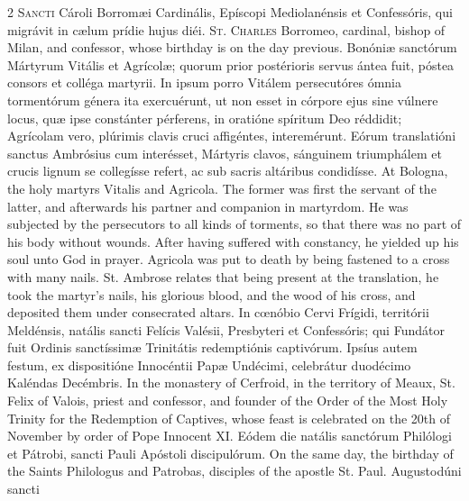 \begin{paracol}{2}
	\lettrine[lines=2]{S}{ancti} Cároli Borromæi Cardinális, Epíscopi
	Mediolanénsis et Confessóris, qui migrávit in cælum prídie hujus diéi.
\switchcolumn
{}
	\lettrine[lines=2]{S}{t. Charles} Borromeo, cardinal, bishop of Milan, and
	confessor, whose birthday is on the day previous.
\switchcolumn*
{}
Bonóniæ sanctórum Mártyrum Vitális et Agrícolæ; quorum prior postérioris servus
	ántea fuit, póstea consors et colléga martyrii. In ipsum porro Vitálem
	persecutóres ómnia tormentórum génera ita exercuérunt, ut non esset in
	córpore ejus sine vúlnere locus, quæ ipse constánter pérferens, in oratióne
	spíritum Deo réddidit; Agrícolam vero, plúrimis clavis cruci affigéntes,
	interemérunt. Eórum translatióni sanctus Ambrósius cum interésset, Mártyris
	clavos, sánguinem triumphálem et crucis lignum se collegísse refert, ac sub
	sacris altáribus condidísse.
\switchcolumn
{}
At Bologna, the holy martyrs Vitalis and Agricola. The former was first the
	servant of the latter, and afterwards his partner and companion in
	martyrdom. He was subjected by the persecutors to all kinds of torments, so
	that there was no part of his body without wounds. After having suffered
	with constancy, he yielded up his soul unto God in prayer. Agricola was put
	to death by being fastened to a cross with many nails. St. Ambrose relates
	that being present at the translation, he took the martyr's nails, his
	glorious blood, and the wood of his cross, and deposited them under
	consecrated altars.
\switchcolumn*
{}
In cœnóbio Cervi 
 Frígidi, territórii Meldénsis, natális sancti Felícis Valésii, Presbyteri et 
 Confessóris; qui Fundátor fuit Ordinis sanctíssimæ Trinitátis redemptiónis 
 captivórum. Ipsíus autem festum, ex dispositióne Innocéntii Papæ 
 Undécimi, celebrátur duodécimo Kaléndas Decémbris.
\switchcolumn
{}
In the monastery of Cerfroid, in the 
 territory of Meaux, St. Felix of Valois, priest and confessor, and founder of the Order of the Most 
 Holy Trinity for the Redemption of Captives, whose feast is celebrated on 
 the 20th of November by order of Pope Innocent XI.
\switchcolumn*
{}
Eódem die natális 
 sanctórum Philólogi et Pátrobi, sancti Pauli Apóstoli discipulórum.
\switchcolumn
{}
On the same day, the birthday of the 
 Saints Philologus and Patrobas, disciples of the apostle St. Paul.
\switchcolumn*
{}
Augustodúni sancti 

\end{paracol}
